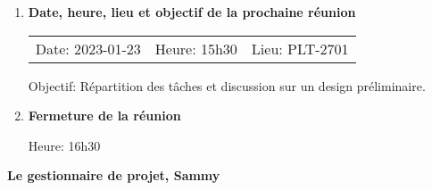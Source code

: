 \documentclass[12pt]{ULojpv}
\begin{document}
\begin{enumerate}

\item \textbf{Date, heure, lieu et objectif de la prochaine réunion}

\begin{tabular}{@{}lll}
   Date: 2023-01-23
   & Heure: 15h30
   &  Lieu: PLT-2701
\end{tabular}
\par

Objectif: Répartition des tâches et discussion sur un design préliminaire.  


\item \textbf{Fermeture de la réunion}

Heure: 16h30




\end{enumerate}

\begin{flushright}
   \textbf{Le gestionnaire de projet, Sammy}

\end{flushright}
\end{document}
